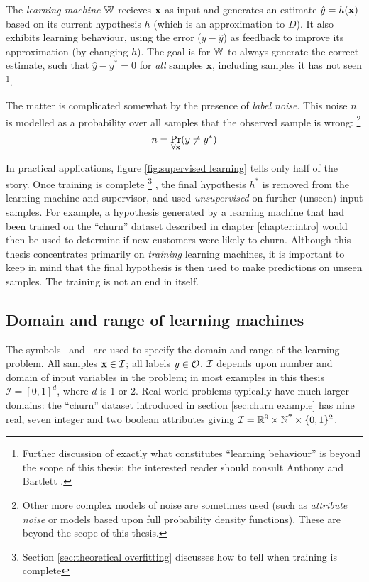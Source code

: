 The \emph{learning machine} $\mathbb{W}$ recieves $\mathbf{x}$ as input and
generates an estimate $\hat{y} = h(\mathbf{x})$ based on its current
hypothesis $h$ (which is an approximation to $D$).  It also exhibits
learning behaviour, using the error ($y - \hat{y}$) as feedback to
improve its approximation (by changing $h$).  The goal is for $\mathbb{W}$
to always generate the correct estimate, such that $\hat{y} - y^{\ast}
= 0$ for \emph{all} samples $\mathbf{x}$, including samples it has not
seen%
\footnote{Further discussion of exactly what constitutes ``learning
behaviour'' is beyond the scope of this thesis; the interested reader
should consult Anthony and Bartlett \cite{Anthony98}.}.

The matter is complicated somewhat by the presence of \emph{label
noise}.  This noise $n$ is modelled as a probability over all samples
that the observed sample is wrong:
\footnote{Other more complex models of noise are sometimes used (such
as \emph{attribute noise} or models based upon full probability
density functions).  These are beyond the scope of this thesis.}
%
\begin{equation}
n = \Pr_{\forall \mathbf{x}}(y \neq y^{\ast})
\end{equation}

In practical applications, figure \ref{fig:supervised learning} tells
only half of the story.  Once training is complete%
\footnote{Section \ref{sec:theoretical overfitting} discusses how to
tell when training is complete}%
, the final hypothesis $h^{\ast}$ is removed from the learning machine
and supervisor, and used \emph{unsupervised} on further (unseen) input
samples.  For example, a hypothesis generated by a learning machine
that had been trained on the ``churn'' dataset described in chapter
\ref{chapter:intro} would then be used to determine if new customers
were likely to churn.  Although this thesis concentrates primarily on
\emph{training} learning machines, it is important to keep in mind that
the final hypothesis is then used to make predictions on unseen
samples.  The training is not an end in itself.


\subsection{Domain and range of learning machines}
\label{sec:domain and range}

The symbols \calI\ and \calO\ are used to specify the domain and
range of the learning problem.  All samples $\mathbf{x} \in \mathcal{I}$; all
labels $y \in \mathcal{O}$.  $\mathcal{I}$ depends upon number and
domain of input variables in the problem; in most examples in this
thesis $\mathcal{I} = [0,1]^d$, where $d$ is 1 or 2.  Real world
problems typically have much larger domains: the ``churn'' dataset
introduced in section \ref{sec:churn example} has nine real, seven
integer and two boolean attributes giving $\mathcal{I} = \mathbb{R}^9 \times \mathbb{N}^7
\times \{0, 1\}^2$.

